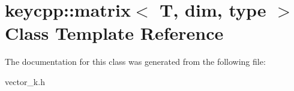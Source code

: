 \hypertarget{classkeycpp_1_1matrix}{\section{keycpp\-:\-:matrix$<$ T, dim, type $>$ Class Template Reference}
\label{classkeycpp_1_1matrix}
}


The documentation for this class was generated from the following file\-:\begin{DoxyCompactItemize}
\item 
vector\-\_\-k.\-h\end{DoxyCompactItemize}

